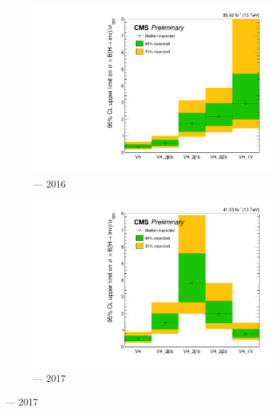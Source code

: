 \begin{figure}[htbp]
    \centering
    \begin{subfigure}[b]{0.45\textwidth}
        \includegraphics[width=\textwidth]{figures/limits/VH/limit_2016_VH_Scenario4.pdf}
        \caption{\VH --- 2016}
    \end{subfigure}
    \hfill
    \begin{subfigure}[b]{0.45\textwidth}
        \includegraphics[width=\textwidth]{figures/limits/VH/limit_2017_VH_Scenario4.pdf}
        \caption{\VH --- 2017}
    \end{subfigure}


\end{figure}
